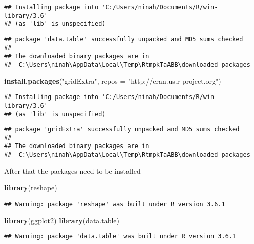 \documentclass[]{article}
\newenvironment{Shaded}{\begin{snugshade}}{\end{snugshade}}
\newcommand{\DataTypeTok}[1]{\textcolor[rgb]{0.13,0.29,0.53}{#1}}
\newcommand{\KeywordTok}[1]{\textcolor[rgb]{0.13,0.29,0.53}{\textbf{#1}}}
\newcommand{\NormalTok}[1]{#1}
\newcommand{\StringTok}[1]{\textcolor[rgb]{0.31,0.60,0.02}{#1}}
\begin{document}
\begin{verbatim}
## Installing package into 'C:/Users/ninah/Documents/R/win-library/3.6'
## (as 'lib' is unspecified)
\end{verbatim}

\begin{verbatim}
## package 'data.table' successfully unpacked and MD5 sums checked
## 
## The downloaded binary packages are in
##  C:\Users\ninah\AppData\Local\Temp\RtmpkTaABB\downloaded_packages
\end{verbatim}

\begin{Shaded}
\begin{Highlighting}[]
\KeywordTok{install.packages}\NormalTok{(}\StringTok{"gridExtra"}\NormalTok{, }\DataTypeTok{repos =} \StringTok{"http://cran.us.r-project.org"}\NormalTok{)}
\end{Highlighting}
\end{Shaded}

\begin{verbatim}
## Installing package into 'C:/Users/ninah/Documents/R/win-library/3.6'
## (as 'lib' is unspecified)
\end{verbatim}

\begin{verbatim}
## package 'gridExtra' successfully unpacked and MD5 sums checked
## 
## The downloaded binary packages are in
##  C:\Users\ninah\AppData\Local\Temp\RtmpkTaABB\downloaded_packages
\end{verbatim}

After that the packages need to be installed

\begin{Shaded}
\begin{Highlighting}[]
\KeywordTok{library}\NormalTok{(reshape)}
\end{Highlighting}
\end{Shaded}

\begin{verbatim}
## Warning: package 'reshape' was built under R version 3.6.1
\end{verbatim}

\begin{Shaded}
\begin{Highlighting}[]
\KeywordTok{library}\NormalTok{(ggplot2)}
\KeywordTok{library}\NormalTok{(data.table)}
\end{Highlighting}
\end{Shaded}

\begin{verbatim}
## Warning: package 'data.table' was built under R version 3.6.1
\end{verbatim}
\end{document}
